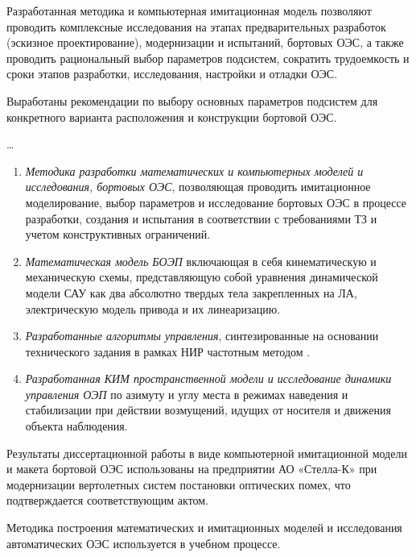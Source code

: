 {\influence} 

Разработанная методика и компьютерная имитационная модель позволяют проводить комплексные исследования на этапах предварительных разработок (эскизное проектирование), модернизации и испытаний, бортовых ОЭС, а также проводить рациональный выбор параметров подсистем, сократить трудоемкость и сроки этапов разработки, исследования, настройки и отладки ОЭС.

Выработаны рекомендации по выбору основных параметров подсистем для конкретного варианта расположения и конструкции бортовой ОЭС.

{\methods} \ldots

{}
\begin{enumerate}
  \item \textit{Методика разработки математических и компьютерных моделей и исследования, бортовых ОЭС}, позволяющая проводить имитационное моделирование, выбор параметров и исследование бортовых ОЭС в процессе разработки, создания и испытания в соответствии с требованиями ТЗ и учетом конструктивных ограничений. 
  \item \textit{Математическая модель БОЭП} включающая в себя кинематическую и механическую схемы, представляющую собой уравнения динамической модели САУ как два абсолютно твердых тела закрепленных на ЛА, электрическую модель привода и их линеаризацию.
  \item \textit{Разработанные алгоритмы управления}, синтезированные на основании технического задания в рамках НИР частотным методом \cite[]{Babaev}.
  \item \textit{Разработанная КИМ пространственной модели и исследование динамики управления ОЭП} по азимуту и углу места в режимах наведения и стабилизации при действии возмущений, идущих от носителя и движения объекта наблюдения.
\end{enumerate}

{\reliability} 


{\probation}
Результаты диссертационной работы в виде компьютерной имитационной модели и макета бортовой ОЭС использованы на предприятии АО «Стелла-К» при модернизации вертолетных систем постановки оптических помех, что подтверждается соответствующим актом.

Методика построения математических и имитационных моделей и исследования автоматических ОЭС используется в учебном процессе.

